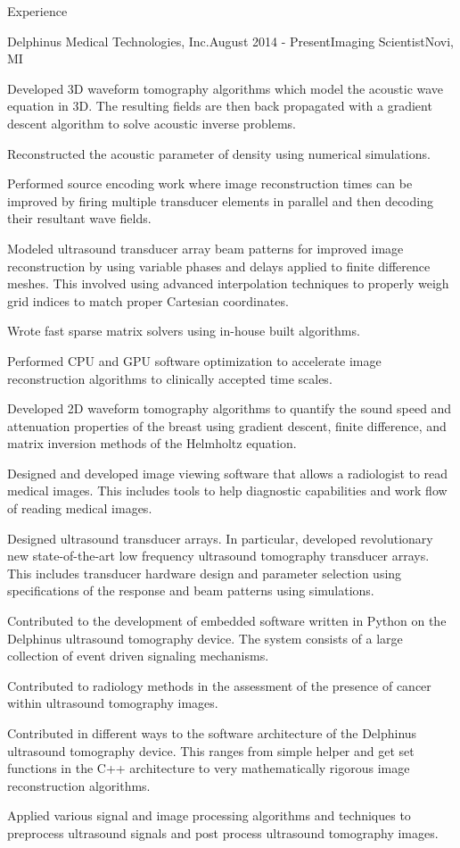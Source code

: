 \documentclass{resume} %
\begin{document}
\begin{rSection}{Experience}
\begin{rSubsection}{Delphinus Medical Technologies, Inc.}{August 2014 - Present}{Imaging Scientist}{Novi, MI}
\item Developed 3D waveform tomography algorithms which model the acoustic wave equation in 3D. The resulting fields are then back propagated with a gradient descent algorithm to solve acoustic inverse problems.
\item Reconstructed the acoustic parameter of density using numerical simulations.
\item Performed source encoding work where image reconstruction times can be improved by firing multiple transducer elements in parallel and then decoding their resultant wave fields.
\item Modeled ultrasound transducer array beam patterns for improved image reconstruction by using variable phases and delays applied to finite difference meshes. This involved using advanced interpolation techniques to properly weigh grid indices to match proper Cartesian coordinates.  
\item Wrote fast sparse matrix solvers using in-house built algorithms.
\item Performed CPU and GPU software optimization to accelerate image reconstruction algorithms to clinically accepted time scales.
\item Developed 2D waveform tomography algorithms to quantify the sound speed and attenuation properties of the breast using gradient descent, finite difference, and matrix inversion methods of the Helmholtz equation.
\item Designed and developed image viewing software that allows a radiologist to read medical images. This includes tools to help diagnostic capabilities and work flow of reading medical images.
\item Designed ultrasound transducer arrays. In particular, developed revolutionary new state-of-the-art low frequency ultrasound tomography transducer arrays. This includes transducer hardware design and parameter selection using specifications of the response and beam patterns using simulations.
\item Contributed to the development of embedded software written in Python on the Delphinus ultrasound tomography device. The system consists of a large collection of event driven signaling mechanisms.
\item Contributed to radiology methods in the assessment of the presence of cancer within ultrasound tomography images.
\item Contributed in different ways to the software architecture of the Delphinus ultrasound tomography device. This ranges from simple helper and get set functions in the C++ architecture to very mathematically rigorous image reconstruction algorithms.
\item Applied various signal and image processing algorithms and techniques to preprocess ultrasound signals and post process ultrasound tomography images.


\end{rSubsection}
\end{rSection}
\end{document}
